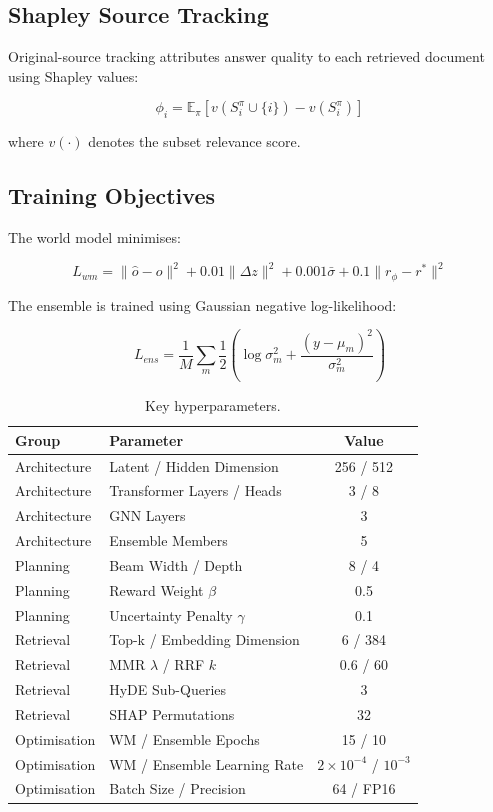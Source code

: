 \subsection{Shapley Source Tracking}

Original-source tracking attributes answer quality to each retrieved document using Shapley values:

\begin{equation}
\phi_i
=
\mathbb{E}_{\pi}
\left[
v(S_i^{\pi}\cup\{i\})
-
v(S_i^{\pi})
\right]
\end{equation}

where $v(\cdot)$ denotes the subset relevance score.

\subsection{Training Objectives}

The world model minimises:

\begin{equation}
L_{wm}
=
\|\hat{o}-o\|^2
+
0.01\|\Delta z\|^2
+
0.001\bar{\sigma}
+
0.1\|r_{\phi}-r^{*}\|^2
\end{equation}

The ensemble is trained using Gaussian negative log-likelihood:

\begin{equation}
L_{ens}
=
\frac{1}{M}
\sum_m
\frac{1}{2}
\left(
\log\sigma_m^2
+
\frac{(y-\mu_m)^2}{\sigma_m^2}
\right)
\end{equation}

\begin{table}[H]
\centering
\caption{Key hyperparameters.}
\label{tab:hyperparameters}
\begin{tabular}{|l|l|c|}
\hline
\textbf{Group} & \textbf{Parameter} & \textbf{Value} \\
\hline
Architecture & Latent / Hidden Dimension & 256 / 512 \\
Architecture & Transformer Layers / Heads & 3 / 8 \\
Architecture & GNN Layers & 3 \\
Architecture & Ensemble Members & 5 \\
Planning & Beam Width / Depth & 8 / 4 \\
Planning & Reward Weight $\beta$ & 0.5 \\
Planning & Uncertainty Penalty $\gamma$ & 0.1 \\
Retrieval & Top-k / Embedding Dimension & 6 / 384 \\
Retrieval & MMR $\lambda$ / RRF $k$ & 0.6 / 60 \\
Retrieval & HyDE Sub-Queries & 3 \\
Retrieval & SHAP Permutations & 32 \\
Optimisation & WM / Ensemble Epochs & 15 / 10 \\
Optimisation & WM / Ensemble Learning Rate & $2\times10^{-4}$ / $10^{-3}$ \\
Optimisation & Batch Size / Precision & 64 / FP16 \\
\hline
\end{tabular}
\end{table}
 
